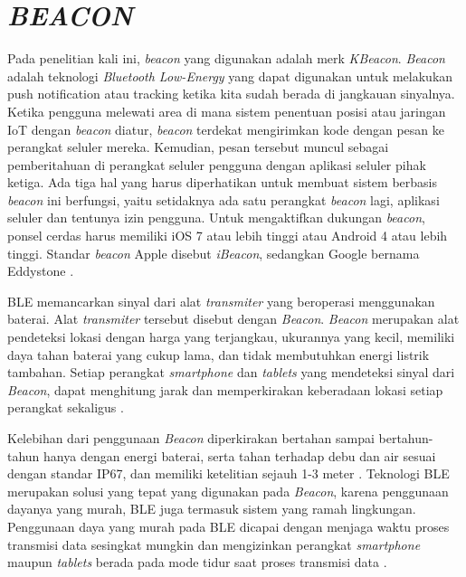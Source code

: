 \section{\uppercase{\textit{BEACON}}}
\par Pada penelitian kali ini, \textit{beacon} yang digunakan adalah merk \textit{KBeacon}. \textit{Beacon} adalah teknologi \textit{Bluetooth Low-Energy} yang dapat digunakan untuk melakukan push notification atau tracking ketika kita sudah berada di jangkauan sinyalnya. Ketika pengguna melewati area di mana sistem penentuan posisi atau jaringan IoT dengan \textit{beacon} diatur, \textit{beacon} terdekat mengirimkan kode dengan pesan ke perangkat seluler mereka. Kemudian, pesan tersebut muncul sebagai pemberitahuan di perangkat seluler pengguna dengan aplikasi seluler pihak ketiga. Ada tiga hal yang harus diperhatikan untuk membuat sistem berbasis \textit{beacon} ini berfungsi, yaitu setidaknya ada satu perangkat \textit{beacon} lagi, aplikasi seluler dan tentunya izin pengguna. Untuk mengaktifkan dukungan \textit{beacon}, ponsel cerdas harus memiliki iOS 7 atau lebih tinggi atau Android 4 atau lebih tinggi. Standar \textit{beacon} Apple disebut \textit{iBeacon}, sedangkan Google bernama Eddystone \citep{Kim2014}.

\par BLE memancarkan sinyal dari alat \textit{transmiter} yang beroperasi menggunakan baterai. Alat \textit{transmiter} tersebut disebut dengan \textit{Beacon}. \textit{Beacon} merupakan alat pendeteksi lokasi dengan harga yang terjangkau, ukurannya yang kecil, memiliki daya tahan baterai yang cukup lama, dan tidak membutuhkan energi listrik tambahan. Setiap perangkat \textit{smartphone} dan \textit{tablets} yang mendeteksi sinyal dari \textit{Beacon}, dapat menghitung jarak dan memperkirakan keberadaan lokasi setiap perangkat sekaligus \citep{Keluza2017}.

\par Kelebihan dari penggunaan \textit{Beacon} diperkirakan bertahan sampai bertahun-tahun hanya dengan energi baterai, serta tahan terhadap debu dan air sesuai dengan standar IP67, dan memiliki ketelitian sejauh 1-3 meter \citep{Insoft2016}. Teknologi BLE merupakan solusi yang tepat yang digunakan pada \textit{Beacon}, karena penggunaan dayanya yang murah, BLE juga termasuk sistem yang ramah lingkungan. Penggunaan daya yang murah pada BLE dicapai dengan menjaga waktu proses transmisi data sesingkat mungkin dan mengizinkan perangkat \textit{smartphone} maupun \textit{tablets} berada pada mode tidur saat proses transmisi data \citep{Feng2011}.

